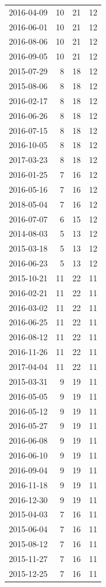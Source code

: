 \begin{tabular}{lrrr}
2016-04-09 & 10 & 21 & 12 \\
2016-06-01 & 10 & 21 & 12 \\
2016-08-06 & 10 & 21 & 12 \\
2016-09-05 & 10 & 21 & 12 \\
2015-07-29 & 8 & 18 & 12 \\
2015-08-06 & 8 & 18 & 12 \\
2016-02-17 & 8 & 18 & 12 \\
2016-06-26 & 8 & 18 & 12 \\
2016-07-15 & 8 & 18 & 12 \\
2016-10-05 & 8 & 18 & 12 \\
2017-03-23 & 8 & 18 & 12 \\
2016-01-25 & 7 & 16 & 12 \\
2016-05-16 & 7 & 16 & 12 \\
2018-05-04 & 7 & 16 & 12 \\
2016-07-07 & 6 & 15 & 12 \\
2014-08-03 & 5 & 13 & 12 \\
2015-03-18 & 5 & 13 & 12 \\
2016-06-23 & 5 & 13 & 12 \\
2015-10-21 & 11 & 22 & 11 \\
2016-02-21 & 11 & 22 & 11 \\
2016-03-02 & 11 & 22 & 11 \\
2016-06-25 & 11 & 22 & 11 \\
2016-08-12 & 11 & 22 & 11 \\
2016-11-26 & 11 & 22 & 11 \\
2017-04-04 & 11 & 22 & 11 \\
2015-03-31 & 9 & 19 & 11 \\
2016-05-05 & 9 & 19 & 11 \\
2016-05-12 & 9 & 19 & 11 \\
2016-05-27 & 9 & 19 & 11 \\
2016-06-08 & 9 & 19 & 11 \\
2016-06-10 & 9 & 19 & 11 \\
2016-09-04 & 9 & 19 & 11 \\
2016-11-18 & 9 & 19 & 11 \\
2016-12-30 & 9 & 19 & 11 \\
2015-04-03 & 7 & 16 & 11 \\
2015-06-04 & 7 & 16 & 11 \\
2015-08-12 & 7 & 16 & 11 \\
2015-11-27 & 7 & 16 & 11 \\
2015-12-25 & 7 & 16 & 11 \\

\end{tabular}
